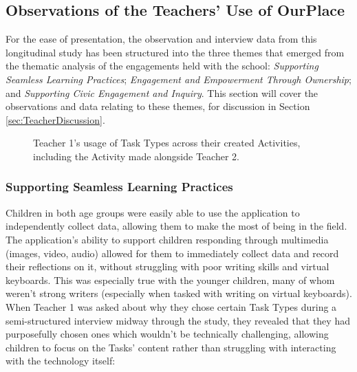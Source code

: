 \subsection{Observations of the Teachers' Use of OurPlace}

For the ease of presentation, the observation and interview data from this longitudinal study has been structured into the three themes that emerged from the thematic analysis of the engagements held with the school: \textit{Supporting Seamless Learning Practices}; \textit{Engagement and Empowerment Through Ownership}; and \textit{Supporting Civic Engagement and Inquiry}. This section will cover the observations and data relating to these themes, for discussion in Section \ref{sec:TeacherDiscussion}.

\begin{figure}
    \centering
    \caption[Teacher 1's usage of Task Types across their created Activities]{Teacher 1's usage of Task Types across their created Activities, including the Activity made alongside Teacher 2.}
    \label{fig:TaskTypeUsage}
\end{figure}

\subsubsection{Supporting Seamless Learning Practices}

Children in both age groups were easily able to use the application to independently collect data, allowing them to make the most of being in the field. The application's ability to support children responding through multimedia (images, video, audio) allowed for them to immediately collect data and record their reflections on it, without struggling with poor writing skills and virtual keyboards. This was especially true with the younger children, many of whom weren't strong writers (especially when tasked with writing on virtual keyboards). When Teacher 1 was asked about why they chose certain Task Types during a semi-structured interview midway through the study, they revealed that they had purposefully chosen ones which wouldn’t be technically challenging, allowing children to focus on the Tasks' content rather than struggling with interacting with the technology itself: 

